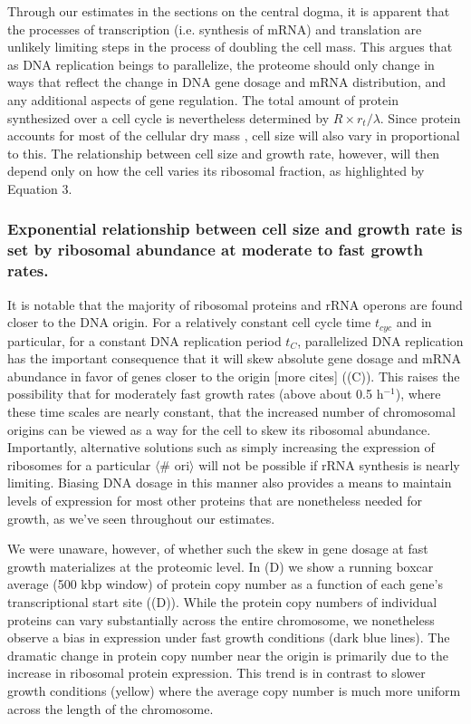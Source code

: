 Through our estimates in the sections on the central dogma, it is
apparent that the processes of transcription (i.e. synthesis of mRNA) and
translation are unlikely limiting steps in the process of doubling the
cell mass. This argues that as DNA replication beings to parallelize, the
proteome should only change in ways that reflect the change in DNA gene dosage
and mRNA distribution, and any additional aspects of gene regulation.
The total amount of protein synthesized over a cell cycle is nevertheless
determined by $R \times r_t / \lambda$. Since protein accounts for most of
the cellular dry mass \citep{bremer2008, basan2015}, cell size will also vary
in proportional to this. The relationship between cell size and growth rate,
however, will then depend only on how the cell varies its ribosomal
fraction, as highlighted by Equation 3.

\subsubsection{Exponential relationship between cell size and growth rate is
set by ribosomal abundance at moderate to fast growth rates.}

It is notable that the majority of ribosomal proteins and rRNA operons are found
closer to the DNA origin. For a relatively constant cell cycle time $t_{cyc}$
and in particular, for a constant DNA replication period $t_C$, parallelized DNA
replication has the important consequence that it will skew absolute gene dosage
and mRNA abundance in favor of genes closer to the origin \citep{scholz2019}
[more cites] ((C)). This raises the possibility
that for moderately fast growth rates (above about 0.5 h$^{-1}$), where these
time scales are nearly constant, that the increased number of chromosomal
origins can be viewed as a way for the cell to skew its ribosomal abundance.
Importantly, alternative solutions such as simply increasing the expression of
ribosomes for a particular $\langle$\# ori$\rangle$ will not be possible if rRNA
synthesis is nearly limiting. Biasing DNA dosage in this manner  also provides a
means to maintain levels of expression for most other proteins that are
nonetheless needed for growth, as we've seen throughout our estimates.

We were unaware, however, of whether such the skew in gene dosage at fast growth
materializes at the proteomic level. In (D) we show
a running boxcar average (500 kbp window) of protein copy number as a function
of each gene's transcriptional start site ((D)).
While the protein copy numbers of individual proteins can vary substantially
across the entire chromosome, we nonetheless observe a bias in expression under
fast growth conditions (dark blue lines). The dramatic change in protein copy
number near the origin is primarily due to the increase in ribosomal protein
expression. This trend is in contrast to slower growth conditions (yellow) where
the average copy number is much more uniform across the length of the chromosome.

